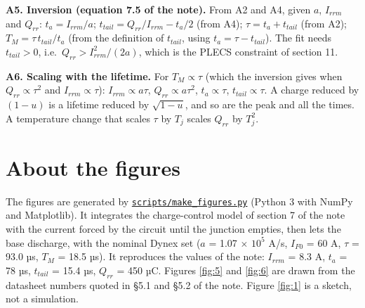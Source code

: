 \documentclass[11pt,a4paper,numbers=noenddot]{scrartcl}
\begin{document}
\begin{onehalfspace}
\textbf{A5. Inversion (equation 7.5 of the note).} From A2 and A4, given \(a\), \(I_{rrm}\) and \(Q_{rr}\): \(t_a = I_{rrm}/a\); \(t_{tail} = Q_{rr}/I_{rrm} - t_a/2\) (from A4); \(\tau = t_a + t_{tail}\) (from A2); \(T_M = \tau\, t_{tail}/t_a\) (from the definition of \(t_{tail}\), using \(t_a = \tau - t_{tail}\)). The fit needs \(t_{tail} > 0\), i.e.~\(Q_{rr} > I_{rrm}^2/(2a)\), which is the PLECS constraint of section 11.

\textbf{A6. Scaling with the lifetime.} For \(T_M \propto \tau\) (which the inversion gives when \(Q_{rr} \propto \tau^2\) and \(I_{rrm} \propto \tau\)): \(I_{rrm} \propto a\tau\), \(Q_{rr} \propto a\tau^2\), \(t_a \propto \tau\), \(t_{tail} \propto \tau\). A charge reduced by \((1-u)\) is a lifetime reduced by \(\sqrt{1-u}\), and so are the peak and all the times. A temperature change that scales \(\tau\) by \(T_j\) scales \(Q_{rr}\) by \(T_j^2\).

\section{About the figures}\label{about-the-figures}

The figures are generated by \href{https://github.com/pwr-control/Semiconductor-Physics-and-Devices/blob/main/diode-reverse-recovery/scripts/make_figures.py}{\texttt{scripts/make\_figures.py}} (Python 3 with NumPy and Matplotlib). It integrates the charge-control model of section 7 of the note with the current forced by the circuit until the junction empties, then lets the base discharge, with the nominal Dynex set (\(a\) = 1.07 \(\times\) \(10^{5}\) A/s, \(I_{F0}\) = 60 A, \(\tau\) = 93.0 µs, \(T_M\) = 18.5 µs). It reproduces the values of the note: \(I_{rrm}\) = 8.3 A, \(t_a\) = 78 µs, \(t_{tail}\) = 15.4 µs, \(Q_{rr}\) = 450 µC. Figures \ref{fig:5} and \ref{fig:6} are drawn from the datasheet numbers quoted in \S5.1 and \S5.2 of the note. Figure \ref{fig:1} is a sketch, not a simulation.

\end{onehalfspace}
\end{document}
